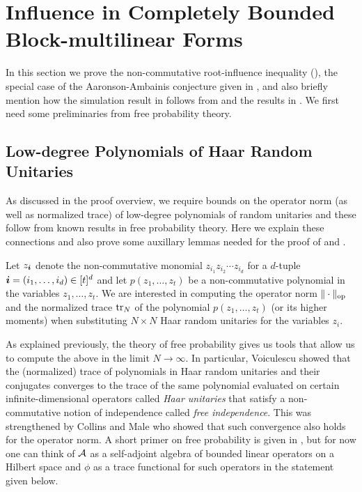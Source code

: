 \section{Influence in Completely Bounded Block-multilinear Forms}
\label{sec:proof}
\newcommand{\blocks}{\mathrm{blocks}}
\newcommand{\lt}{\mathrm{left}}
\newcommand{\rt}{\mathrm{right}}



In this section we prove the non-commutative root-influence inequality (),  the special case of the Aaronson-Ambainis conjecture given in , and also briefly mention how the simulation result in  follows from  and the results in \cite{AA14}. We first need some preliminaries from free probability theory. 



\subsection{Low-degree Polynomials of Haar Random Unitaries}

As discussed in the proof overview, we require bounds on the operator norm (as well as normalized trace) of low-degree polynomials of random unitaries and these follow from known results in free probability theory. Here we explain these connections and also prove some auxillary lemmas needed for the proof of  and . 



Let $z_{{\boldsymbol{i}}}$ denote the non-commutative monomial $z_{i_1} z_{i_2} \cdots z_{i_d}$ for a $d$-tuple ${\boldsymbol{i}}  = (i_1, \ldots, i_d) \in [t]^d$ and let $p(z_1, \ldots, z_t)$ be a non-commutative polynomial in the variables $z_1, \ldots, z_t$. We are interested in computing the operator norm $\|\cdot\|_{\mathrm{op}}$ and the normalized trace  $\mathrm{tr}_N$ of the polynomial $p(z_1, \ldots, z_t)$ (or its higher moments) when substituting $N \times N$ Haar random unitaries for the variables $z_i$.

As explained previously, the theory of free probability gives us tools that allow us to compute  the above in the limit $N \to \infty$. In particular, Voiculescu \cite{V98} showed that the  (normalized) trace of polynomials in Haar random unitaries and their conjugates converges to the trace of the same polynomial evaluated on certain infinite-dimensional operators called \emph{Haar unitaries} that satisfy a non-commutative notion of independence called \emph{free independence}. This was strengthened by Collins and Male \cite{CM11} who showed that such convergence also holds for the operator norm. A short primer on free probability is given in , but for now one can think of $\mathcal A$ as a self-adjoint algebra of bounded linear operators on a Hilbert space and $\phi$ as a trace functional for such operators in the statement given below.


